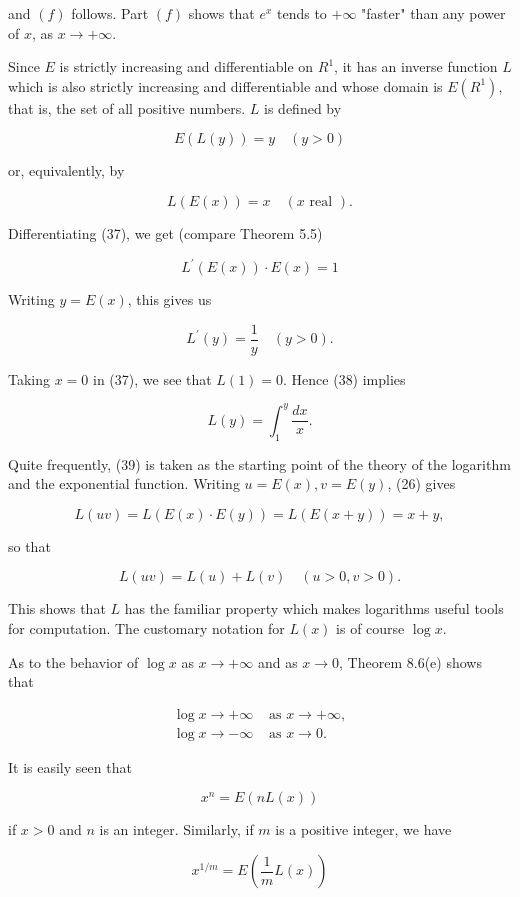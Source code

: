 \documentclass[10pt]{article}
\begin{document}
and $(f)$ follows. Part $(f)$ shows that $e^{x}$ tends to $+\infty$ "faster" than any power of $x$, as $x \rightarrow+\infty$.

Since $E$ is strictly increasing and differentiable on $R^{1}$, it has an inverse function $L$ which is also strictly increasing and differentiable and whose domain is $E\left(R^{1}\right)$, that is, the set of all positive numbers. $L$ is defined by

$$
E(L(y))=y \quad(y>0)
$$

or, equivalently, by

$$
L(E(x))=x \quad(x \text { real }) .
$$

Differentiating (37), we get (compare Theorem 5.5)

$$
L^{\prime}(E(x)) \cdot E(x)=1
$$

Writing $y=E(x)$, this gives us

$$
L^{\prime}(y)=\frac{1}{y} \quad(y>0) .
$$

Taking $x=0$ in (37), we see that $L(1)=0$. Hence (38) implies

$$
L(y)=\int_{1}^{y} \frac{d x}{x} .
$$

Quite frequently, (39) is taken as the starting point of the theory of the logarithm and the exponential function. Writing $u=E(x), v=E(y)$, (26) gives

$$
L(u v)=L(E(x) \cdot E(y))=L(E(x+y))=x+y,
$$

so that

$$
L(u v)=L(u)+L(v) \quad(u>0, v>0) .
$$

This shows that $L$ has the familiar property which makes logarithms useful tools for computation. The customary notation for $L(x)$ is of course $\log x$.

As to the behavior of $\log x$ as $x \rightarrow+\infty$ and as $x \rightarrow 0$, Theorem 8.6(e) shows that

$$
\begin{array}{ll}
\log x \rightarrow+\infty & \text { as } x \rightarrow+\infty, \\
\log x \rightarrow-\infty & \text { as } x \rightarrow 0 .
\end{array}
$$

It is easily seen that

$$
x^{n}=E(n L(x))
$$

if $x>0$ and $n$ is an integer. Similarly, if $m$ is a positive integer, we have

$$
x^{1 / m}=E\left(\frac{1}{m} L(x)\right)
$$
\end{document}

